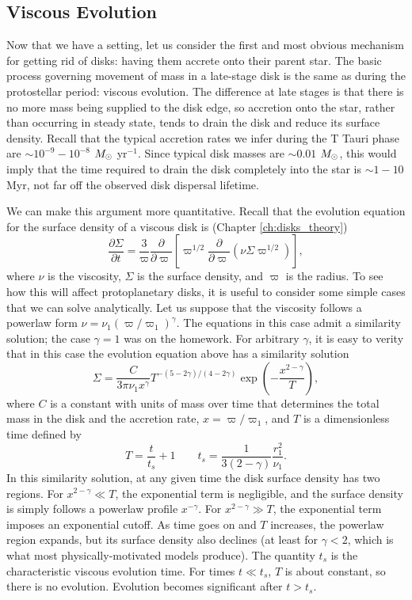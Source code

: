 \subsection{Viscous Evolution}

Now that we have a setting, let us consider the first and most obvious mechanism for getting rid of disks: having them accrete onto their parent star. The basic process governing movement of mass in a late-stage disk is the same as during the protostellar period: viscous evolution. The difference at late stages is that there is no more mass being supplied to the disk edge, so accretion onto the star, rather than occurring in steady state, tends to drain the disk and reduce its surface density. Recall that the typical accretion rates we infer during the T Tauri phase are $\sim 10^{-9}-10^{-8}$ $M_{\odot}$ yr$^{-1}$. Since typical disk masses are $\sim 0.01$ $M_{\odot}$, this would imply that the time required to drain the disk completely into the star is $\sim 1 - 10$ Myr, not far off the observed disk dispersal lifetime.

We can make this argument more quantitative. Recall that the evolution equation for the surface density of a viscous disk is (Chapter \ref{ch:disks_theory})
\begin{equation}
\frac{\partial \Sigma}{\partial t} = \frac{3}{\varpi} \frac{\partial}{\partial \varpi} \left[\varpi^{1/2} \frac{\partial}{\partial \varpi} (\nu \Sigma \varpi^{1/2})\right],
\end{equation}
where $\nu$ is the viscosity, $\Sigma$ is the surface density, and $\varpi$ is the radius. To see how this will affect protoplanetary disks, it is useful to consider some simple cases that we can solve analytically. Let us suppose that the viscosity follows a powerlaw form $\nu=\nu_1 (\varpi/\varpi_1)^\gamma$. The equations in this case admit a similarity solution; the case $\gamma=1$ was on the homework. For arbitrary $\gamma$, it is easy to verity that in this case the evolution equation above has a similarity solution
\begin{equation}
\Sigma = \frac{C}{3\pi\nu_1 x^\gamma} T^{-(5-2\gamma)/(4-2\gamma)} \exp\left(-\frac{x^{2-\gamma}}{T}\right),
\end{equation}
where $C$ is a constant with units of mass over time that determines the total mass in the disk and the accretion rate, $x=\varpi/\varpi_1$, and $T$ is a dimensionless time defined by
\begin{equation}
T = \frac{t}{t_s}+1
\qquad
t_s = \frac{1}{3(2-\gamma)} \frac{r_1^2}{\nu_1}.
\end{equation}
In this similarity solution, at any given time the disk surface density has two regions. For $x^{2-\gamma} \ll T$, the exponential term is negligible, and the surface density is simply follows a powerlaw profile $x^{-\gamma}$. For $x^{2-\gamma} \gg T$, the exponential term imposes an exponential cutoff. As time goes on and $T$ increases, the powerlaw region expands, but its surface density also declines (at least for $\gamma < 2$, which is what most physically-motivated models produce). The quantity $t_s$ is the characteristic viscous evolution time. For times $t\ll t_s$, $T$ is about constant, so there is no evolution. Evolution becomes significant after $t>t_s$.

